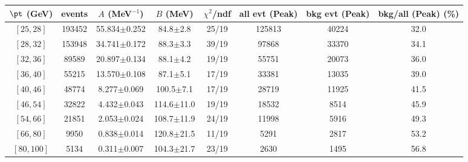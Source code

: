 \begin{tabular}{c|c||c|c|c||c|c|c}
$\pt$ (GeV) & events & $A$ (MeV$^{-1}$) & $B$ (MeV)  & $\chi^2$/ndf & all evt (Peak) & bkg evt (Peak) & bkg/all (Peak) (\%)\\
\hline
$[25, 28]$ & 193452 & 55.834$\pm$0.252 & 84.8$\pm$2.8 & 25/19 & 125813 & 40224 & 32.0  \\
$[28, 32]$ & 153948 & 34.741$\pm$0.172 & 88.3$\pm$3.3 & 39/19 & 97868 & 33370 & 34.1  \\
$[32, 36]$ & 89589 & 20.897$\pm$0.134 & 88.1$\pm$4.2 & 19/19 & 55751 & 20073 & 36.0  \\
$[36, 40]$ & 55215 & 13.570$\pm$0.108 & 87.1$\pm$5.1 & 17/19 & 33381 & 13035 & 39.0  \\
$[40, 46]$ & 48774 & 8.277$\pm$0.069 & 100.5$\pm$7.1 & 17/19 & 28719 & 11925 & 41.5  \\
$[46, 54]$ & 32822 & 4.432$\pm$0.043 & 114.6$\pm$11.0 & 19/19 & 18532 & 8514 & 45.9  \\
$[54, 66]$ & 21851 & 2.053$\pm$0.024 & 108.7$\pm$11.9 & 24/19 & 11998 & 5916 & 49.3  \\
$[66, 80]$ & 9950 & 0.838$\pm$0.014 & 120.8$\pm$21.5 & 11/19 & 5291 & 2817 & 53.2  \\
$[80, 100]$ & 5134 & 0.311$\pm$0.007 & 104.3$\pm$21.7 & 23/19 & 2630 & 1495 & 56.8  \\
\end{tabular}
